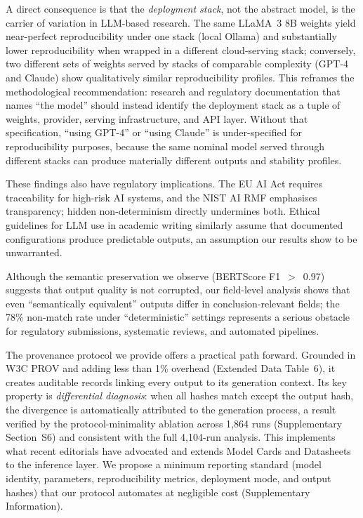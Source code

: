 \documentclass[sn-nature]{sn-jnl}
\begin{document}
A direct consequence is that the \emph{deployment stack}, not the abstract model, is the carrier of variation in LLM-based research.
The same LLaMA~3 8B weights yield near-perfect reproducibility under one stack (local Ollama) and substantially lower reproducibility when wrapped in a different cloud-serving stack; conversely, two different sets of weights served by stacks of comparable complexity (GPT-4 and Claude) show qualitatively similar reproducibility profiles.
This reframes the methodological recommendation: research and regulatory documentation that names ``the model'' should instead identify the deployment stack as a tuple of weights, provider, serving infrastructure, and API layer.
Without that specification, ``using GPT-4'' or ``using Claude'' is under-specified for reproducibility purposes, because the same nominal model served through different stacks can produce materially different outputs and stability profiles.

These findings also have regulatory implications.
The EU AI Act\cite{euaiact2024} requires traceability for high-risk AI systems, and the NIST AI RMF\cite{nist2023ai} emphasises transparency; hidden non-determinism directly undermines both.
Ethical guidelines for LLM use in academic writing\cite{porsdam2024ethics} similarly assume that documented configurations produce predictable outputs, an assumption our results show to be unwarranted.

Although the semantic preservation we observe (BERTScore F1~$>$~0.97) suggests that output quality is not corrupted, our field-level analysis shows that even ``semantically equivalent'' outputs differ in conclusion-relevant fields; the 78\% non-match rate under ``deterministic'' settings represents a serious obstacle for regulatory submissions, systematic reviews, and automated pipelines.

The provenance protocol we provide offers a practical path forward.
Grounded in W3C PROV\cite{w3cprov2013} and adding less than 1\% overhead (Extended Data Table~6), it creates auditable records linking every output to its generation context.
Its key property is \emph{differential diagnosis}: when all hashes match except the output hash, the divergence is automatically attributed to the generation process, a result verified by the protocol-minimality ablation across 1{,}864 runs (Supplementary Section~S6) and consistent with the full 4{,}104-run analysis.
This implements what recent editorials have advocated\cite{editorial2024framework} and extends Model Cards\cite{mitchell2019model} and Datasheets\cite{gebru2021datasheets} to the inference layer.
We propose a minimum reporting standard (model identity, parameters, reproducibility metrics, deployment mode, and output hashes) that our protocol automates at negligible cost (Supplementary Information).
\end{document}
